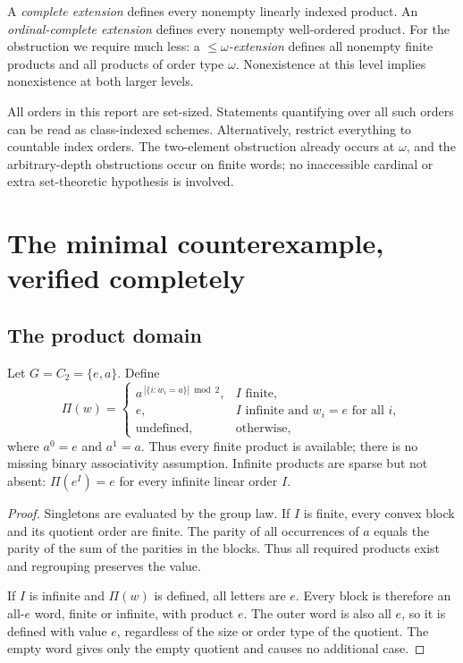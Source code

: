 \documentclass[11pt,letterpaper]{article}
\numberwithin{equation}{section}
\newtheorem{lemma}[theorem]{Lemma}
\theoremstyle{definition}
\theoremstyle{remark}
\newcommand{\undefinedprod}{\text{undefined}}
\newcommand{\set}[1]{\{#1\}}
\begin{document}
A \emph{complete extension} defines every nonempty linearly indexed product. An \emph{ordinal-complete extension} defines every nonempty well-ordered product. For the obstruction we require much less: a \emph{$\leq\omega$-extension} defines all nonempty finite products and all products of order type $\omega$. Nonexistence at this level implies nonexistence at both larger levels.

All orders in this report are set-sized. Statements quantifying over all such orders can be read as class-indexed schemes. Alternatively, restrict everything to countable index orders. The two-element obstruction already occurs at $\omega$, and the arbitrary-depth obstructions occur on finite words; no inaccessible cardinal or extra set-theoretic hypothesis is involved.

\section{The minimal counterexample, verified completely}
\label{sec:minimal}
\subsection{The product domain}
Let $G=C_2=\set{e,a}$. Define
\begin{equation}\label{eq:C2-domain}
\Pi(w)=
\begin{cases}
 a^{\,|\{i:w_i=a\}|\bmod 2}, & I\text{ finite},\\
 e, & I\text{ infinite and }w_i=e\text{ for all }i,\\
 \undefinedprod, & \text{otherwise},
\end{cases}
\end{equation}
where $a^0=e$ and $a^1=a$. Thus every finite product is available; there is no missing binary associativity assumption. Infinite products are sparse but not absent: $\Pi(e^I)=e$ for every infinite linear order $I$.

\begin{proof}
Singletons are evaluated by the group law. If $I$ is finite, every convex block and its quotient order are finite. The parity of all occurrences of $a$ equals the parity of the sum of the parities in the blocks. Thus all required products exist and regrouping preserves the value.

If $I$ is infinite and $\Pi(w)$ is defined, all letters are $e$. Every block is therefore an all-$e$ word, finite or infinite, with product $e$. The outer word is also all $e$, so it is defined with value $e$, regardless of the size or order type of the quotient. The empty word gives only the empty quotient and causes no additional case.
\end{proof}
\end{document}
